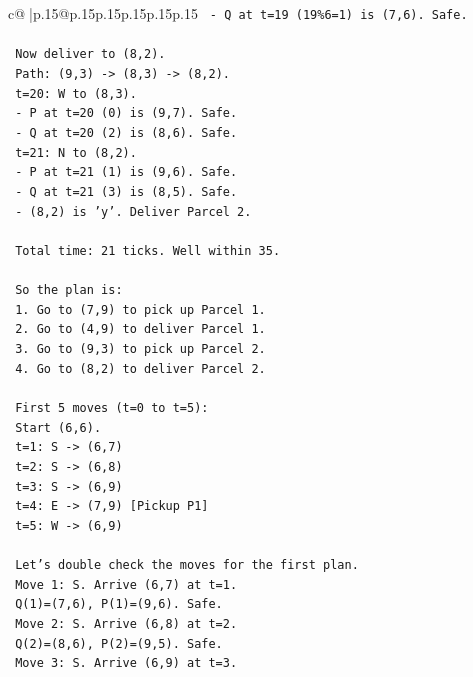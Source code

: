\documentclass{article}
\begin{document}
{\begin{supertabular}{c@{$\;$}|p{.15\linewidth}@{}p{.15\linewidth}p{.15\linewidth}p{.15\linewidth}p{.15\linewidth}p{.15\linewidth}}
{{{\texttt{  {-} Q at t=19 (19\%6=1) is (7,6). Safe.} \\
\\ 
\texttt{  Now deliver to (8,2).} \\
\texttt{  Path: (9,3) {-}> (8,3) {-}> (8,2).} \\
\texttt{  t=20: W to (8,3).} \\
\texttt{  {-} P at t=20 (0) is (9,7). Safe.} \\
\texttt{  {-} Q at t=20 (2) is (8,6). Safe.} \\
\texttt{  t=21: N to (8,2).} \\
\texttt{  {-} P at t=21 (1) is (9,6). Safe.} \\
\texttt{  {-} Q at t=21 (3) is (8,5). Safe.} \\
\texttt{  {-} (8,2) is 'y'. Deliver Parcel 2.} \\
\\ 
\texttt{  Total time: 21 ticks. Well within 35.} \\
\\ 
\texttt{  So the plan is:} \\
\texttt{  1. Go to (7,9) to pick up Parcel 1.} \\
\texttt{  2. Go to (4,9) to deliver Parcel 1.} \\
\texttt{  3. Go to (9,3) to pick up Parcel 2.} \\
\texttt{  4. Go to (8,2) to deliver Parcel 2.} \\
\\ 
\texttt{  First 5 moves (t=0 to t=5):} \\
\texttt{  Start (6,6).} \\
\texttt{  t=1: S {-}> (6,7)} \\
\texttt{  t=2: S {-}> (6,8)} \\
\texttt{  t=3: S {-}> (6,9)} \\
\texttt{  t=4: E {-}> (7,9) {[}Pickup P1{]}} \\
\texttt{  t=5: W {-}> (6,9)} \\
\\ 
\texttt{  Let's double check the moves for the first plan.} \\
\texttt{  Move 1: S. Arrive (6,7) at t=1.} \\
\texttt{    Q(1)=(7,6), P(1)=(9,6). Safe.} \\
\texttt{  Move 2: S. Arrive (6,8) at t=2.} \\
\texttt{    Q(2)=(8,6), P(2)=(9,5). Safe.} \\
\texttt{  Move 3: S. Arrive (6,9) at t=3.} \\
}}}
\end{supertabular}}
\end{document}
